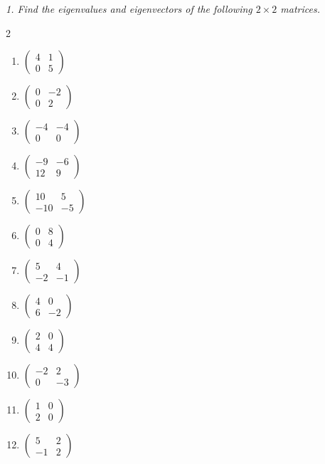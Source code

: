 \emph{1. Find the eigenvalues and eigenvectors of the following
$2\times2$ matrices.}
\bigskip
\begin{multicols}{2}\raggedright
\begin{enumerate}[label=\arabic*., leftmargin=*]
\item $\begin{pmatrix}4 & 1\\ 0 & 5\end{pmatrix}$
\item $\begin{pmatrix}0 & -2\\ 0 & 2\end{pmatrix}$
\item $\begin{pmatrix}-4 & -4\\ 0 & 0\end{pmatrix}$
\item $\begin{pmatrix}-9 & -6\\ 12 & 9\end{pmatrix}$
\item $\begin{pmatrix}10 & 5\\ -10 & -5\end{pmatrix}$
\item $\begin{pmatrix}0 & 8\\ 0 & 4\end{pmatrix}$
\item $\begin{pmatrix}5 & 4\\ -2 & -1\end{pmatrix}$
\item $\begin{pmatrix}4 & 0\\ 6 & -2\end{pmatrix}$
\item $\begin{pmatrix}2 & 0\\ 4 & 4\end{pmatrix}$
\item $\begin{pmatrix}-2 & 2\\ 0 & -3\end{pmatrix}$
\item $\begin{pmatrix}1 & 0\\ 2 & 0\end{pmatrix}$
\item $\begin{pmatrix}5 & 2\\ -1 & 2\end{pmatrix}$

\end{enumerate}
\end{multicols}
